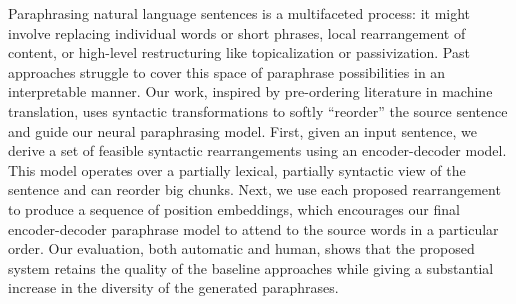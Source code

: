 Paraphrasing natural language sentences is a multifaceted process: it might involve replacing individual words or short phrases, local rearrangement of content, or high-level restructuring like topicalization or passivization. Past approaches struggle to cover this space of paraphrase possibilities in an interpretable manner. Our work, inspired by pre-ordering literature in machine translation, uses syntactic transformations to softly ``reorder'' the source sentence and guide our neural paraphrasing model. First, given an input sentence, we derive a set of feasible syntactic rearrangements using an encoder-decoder model. This model operates over a partially lexical, partially syntactic view of the sentence and can reorder big chunks. Next, we use each proposed rearrangement to produce a sequence of position embeddings, which encourages our final encoder-decoder paraphrase model to attend to the source words in a particular order. Our evaluation, both automatic and human, shows that the proposed system retains the quality of the baseline approaches while giving a substantial increase in the diversity of the generated paraphrases.
